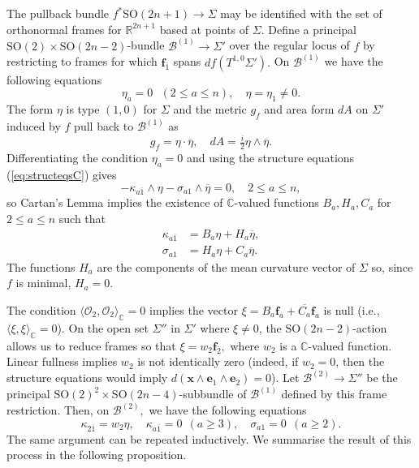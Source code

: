\documentclass[11pt]{article}
\theoremstyle{definition}
\newcommand{\R}{\mathbb{R}}
\newcommand{\C}{\mathbb{C}}
\newcommand{\SO}{\mathrm{SO}}
\numberwithin{equation}{section}
\begin{document}
The pullback bundle $f^* \SO(2n+1) \to \Sigma$ may be identified with the set of orthonormal frames for $\R^{2n+1}$ based at points of $\Sigma.$ Define a principal $\SO(2) \times \SO(2n-2)$-bundle $\mathcal{B}^{(1)} \to \Sigma'$ over the regular locus of $f$ by restricting to frames for which $\mathbf{f}_{\overline{1}}$ spans $df(T^{1,0}\Sigma').$ On $\mathcal{B}^{(1)}$ we have the following equations
\begin{equation*}
	\eta_{a} = 0 \:\:\: (2 \leq a \leq n), \quad \eta = \eta_1 \neq 0.
\end{equation*}
The form $\eta$ is type $(1,0)$ for $\Sigma$ and the metric $g_{f}$ and area form $dA$ on $\Sigma'$ induced by $f$ pull back to $\mathcal{B}^{(1)}$ as
\begin{equation*}
	g_{f} = \eta \cdot \overline{\eta}, \quad dA = \tfrac{i}{2} \eta \wedge \overline{\eta}.
\end{equation*}
Differentiating the condition $\eta_a = 0$ and using the structure equations (\ref{eq:structeqsC}) gives
\begin{equation*}
	-\kappa_{a \overline{1}} \wedge \eta - \sigma_{a1} \wedge \overline{\eta} = 0, \quad 2 \leq a \leq n,
\end{equation*}
so Cartan's Lemma implies the existence of $\C$-valued functions $B_a, H_a, C_a$ for $2 \leq a \leq n$ such that
\begin{equation*}
	\begin{aligned}
		\kappa_{a \overline{1}} & = B_a \eta + H_a \overline{\eta}, \\
		\sigma_{a1}             & = H_a \eta + C_a \overline{\eta}. 
	\end{aligned}
\end{equation*}
The functions $H_a$ are the components of the mean curvature vector of $\Sigma$ so, since $f$ is minimal, $H_a = 0$. 
    
The condition $\langle \mathcal{O}_2, \mathcal{O}_2 \rangle_{\C} = 0$ implies the vector $\xi = B_a \mathbf{f}_{\overline{a}} + \overline{C_a} \mathbf{f}_a$ is null (i.e., $\langle \xi, \xi \rangle_{\C} = 0$). On the open set $\Sigma''$ in $\Sigma'$ where $\xi \neq 0$, the $\SO(2n-2)$-action allows us to reduce frames so that $\xi = w_2 \mathbf{f}_{\overline{2}},$ where $w_2$ is a $\C$-valued function. Linear fullness implies $w_2$ is not identically zero (indeed, if $w_2 = 0$, then the structure equations would imply $d(\mathbf{x} \wedge \mathbf{e}_1 \wedge \mathbf{e}_2) = 0$). Let $\mathcal{B}^{(2)} \to \Sigma''$ be the principal $\SO(2)^2 \times \SO(2n-4)$-subbundle of $\mathcal{B}^{(1)}$ defined by this frame restriction. Then, on $\mathcal{B}^{(2)},$ we have the following equations
\begin{equation*}
	\kappa_{2 \overline{1}} = w_2 \eta, \quad \kappa_{a \overline{1}} = 0 \:\: (a \geq 3), \quad \sigma_{a1} = 0 \:\: (a \geq 2).
\end{equation*}
The same argument can be repeated inductively. We summarise the result of this process in the following proposition.
\end{document}
